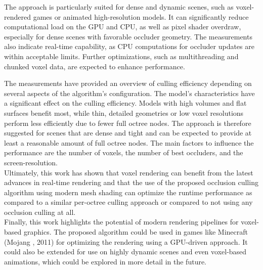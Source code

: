 \clearpage

\noindent
The approach is particularly suited for dense and dynamic scenes, such as voxel-rendered 
games or animated high-resolution models. It can significantly reduce computational load 
on the \ac{GPU} and \ac{CPU}, as well as pixel shader overdraw, especially for dense scenes with 
favorable occluder geometry. The measurements also indicate real-time capability, as 
\ac{CPU} computations for occluder updates are within acceptable limits. Further 
optimizations, such as multithreading and chunked voxel data, are expected to enhance 
performance.


\noindent
The measurements have provided an overview of culling efficiency depending on several 
aspects of the algorithm's configuration. The model's characteristics have a significant 
effect on the culling efficiency. Models with high volumes and flat surfaces benefit most, 
while thin, detailed geometries or low voxel resolutions perform less efficiently due 
to fewer full octree nodes. The approach is therefore suggested for scenes that are dense 
and tight and can be expected to provide at least a reasonable amount of full octree nodes. 
The main factors to influence the performance are the number of voxels, the number of 
best occluders, and the screen-resolution.\\

\noindent
Ultimately, this work has shown that voxel rendering can benefit from the latest advances 
in real-time rendering and that the use of the proposed occlusion culling algorithm 
using modern mesh shading can optimize the runtime performance as compared to a similar 
per-octree culling approach or compared to not using any occlusion culling at all. \\

\noindent
Finally, this work highlights the potential of modern rendering pipelines for voxel-based 
graphics. The proposed algorithm could be used in games like \ac{Minecraft} (Mojang 
\cite{Mojang}, 2011) for optimizing the rendering using a \ac{GPU}-driven approach. It 
could also be extended for use on highly dynamic scenes and even voxel-based animations, 
which could be explored in more detail in the future.

